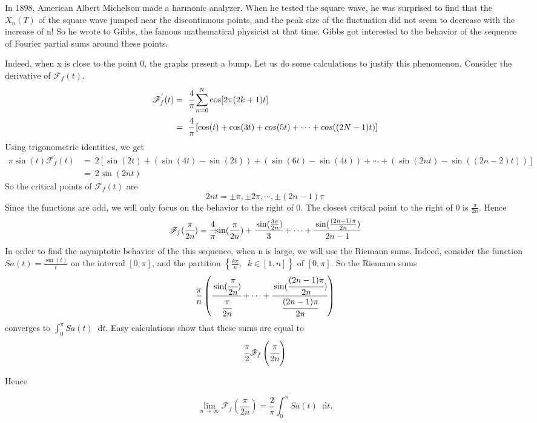 \documentclass[margin,line]{res}
\newcommand*{\dif}{\mathop{}\!\mathrm{d}}
\begin{document}
\begin{resume}
In 1898, American Albert Michelson made a harmonic analyzer. When he tested the square wave, he was surprised to find that the $X_n(T)$ of the square wave jumped near the discontinuous points, and the peak size of the fluctuation did not seem to decrease with the increase of n! So he wrote to Gibbs, the famous mathematical physicist at that time. Gibbs got interested to the behavior of the sequence of Fourier partial sums around these points. \par
Indeed, when x is close to the point 0, the graphs present a bump. Let us do some calculations to justify this phenomenon. Consider the derivative of $\mathscr{F}_f(t)$.
\begin{align}
\mathscr{F}^{'}_f(t) 
	&= \ \cfrac{4}{\pi} \sum\limits_{n=0}^N{\cos [2\pi (2k+1)t]} \nonumber \\
	&= \ \cfrac{4}{\pi} \left[ \cos(t) + \cos(3t) + cos(5t) + \cdots + cos((2N-1)t) \right] \nonumber 
\end{align}
Using trigonometric identities, we get 
\begin{align}
\pi\sin(t) \mathscr{F}^{'}_f(t) 
	&= \ 2\left[ \sin(2t) + (\sin(4t)-\sin(2t)) + (\sin(6t)-\sin(4t)) + \cdots + (\sin(2nt)-\sin((2n-2)t))\right] \nonumber \\
	&= \ 2\sin(2nt) \nonumber
\end{align}
So the critical points of $\mathscr{F}_f(t)$ are 
$$
2nt = \pm\pi , \pm 2\pi,\cdots,\pm (2n-1)\pi
$$
Since the functions are odd, we will only focus on the behavior to the right of 0. The closest critical point to the right of 0 is $\frac{\pi}{2n}$. Hence 
$$
\mathscr{F}_f(\cfrac{\pi}{2n}) = \cfrac{4}{\pi} {
	\sin(\frac{\pi}{2n}) + \cfrac{\sin(\frac{3\pi}{2n})}{3} + \cdots +
	\cfrac{\sin(\frac{(2n-1)\pi}{2n})}{2n-1}
}
$$
In order to find the asymptotic behavior of the this sequence, when n is large, we will use the Riemann sums. Indeed, consider the function $Sa(t) = \frac{\sin(t)}{t}$ on the interval $[0,\pi]$, and the partition $\left\{{\frac{k\pi}{n}}, \;\;k \in [1,n]\right\}$ of $[0,\pi]$. So the Riemann sums
$$
\frac{\pi}{n}
\left(
	\cfrac{\sin(\cfrac{\pi}{2n})}{\cfrac{\pi}{2n}} + \cdots +
	\cfrac{\sin(\cfrac{(2n-1)\pi}{2n})}{\cfrac{(2n-1)\pi}{2n}}
\right)
$$
converges to $\int_{0}^{\pi} Sa(t) \dif t$. Easy calculations show that these sums are equal to 
$$
\cfrac{\pi}{2}{\mathscr{F}_f \left( \cfrac{\pi}{2n} \right) }
$$

Hence

$$
\lim_{n \rightarrow \infty} \mathscr{F}_f \left(\frac{\pi}{2n}\right) = \frac{2}{\pi}\int_{0}^{\pi}Sa(t) \dif t.
$$


\end{resume}
\end{document}
